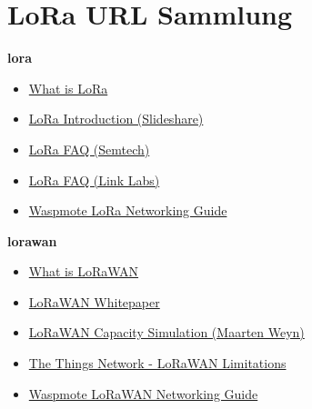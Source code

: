 \chapter{LoRa URL Sammlung}\label{appendix:lora_url_list}

\textbf{\gls{lora}}

\begin{itemize}
\item \href{http://www.link-labs.com/what-is-lora/}{What is LoRa}
\item \href{http://www.slideshare.net/zahidtg/lora-introduction}{LoRa Introduction (Slideshare)}
\item \href{http://www.semtech.com/wireless-rf/lora/LoRa-FAQs.pdf}{LoRa FAQ (Semtech)}
\item \href{http://www.link-labs.com/lora-faqs/}{LoRa FAQ (Link Labs)}
\item \href{http://www.libelium.com/downloads/documentation/waspmote_lora_868mhz_915mhz_sx1272_networking_guide.pdf}{Waspmote LoRa Networking Guide}
\end{itemize}

\textbf{\gls{lorawan}}

\begin{itemize}
\item \href{http://www.link-labs.com/what-is-lorawan/}{What is LoRaWAN}
\item \href{https://www.lora-alliance.org/portals/0/documents/whitepapers/LoRaWAN101.pdf}{LoRaWAN Whitepaper}
\item \href{http://mweyn.wesdec.be/lpwan}{LoRaWAN Capacity Simulation (Maarten Weyn)}
\item \href{http://forum.thethingsnetwork.org/t/universal-lora-wan-gateway-limitations-because-physics/1749/10}{The Things Network - LoRaWAN Limitations}
\item \href{http://www.libelium.com/downloads/documentation/waspmote-lorawan-networking-guide.pdf}{Waspmote LoRaWAN Networking Guide}
\end{itemize}